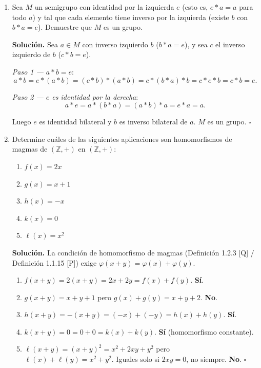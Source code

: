 \begin{enumerate}[label=\textbf{2.\arabic*.}]
\textit{Relación general} (Proposición 1.1.1): \((\mathbb{Z}_n)^*\) es grupo si y
solo si \(n\) es primo. \hfill\(\square\)

\item Sea \(M\) un semigrupo con identidad por la izquierda \(e\) (esto es,
\(e*a=a\) para todo \(a\)) y tal que cada elemento tiene inverso por la izquierda
(existe \(b\) con \(b*a=e\)). Demuestre que \(M\) es un grupo.

\textbf{Solución.}
Sea \(a \in M\) con inverso izquierdo \(b\) (\(b*a=e\)), y sea \(c\) el inverso
izquierdo de \(b\) (\(c*b=e\)).

\textit{Paso 1 --- \(a*b=e\)}:
\[
    a*b = e*(a*b) = (c*b)*(a*b) = c*(b*a)*b = c*e*b = c*b = e.
\]

\textit{Paso 2 --- \(e\) es identidad por la derecha}:
\[
    a*e = a*(b*a) = (a*b)*a = e*a = a.
\]

Luego \(e\) es identidad bilateral y \(b\) es inverso bilateral de \(a\).
\(M\) es un grupo. \hfill\(\square\)

\item Determine cuáles de las siguientes aplicaciones son homomorfismos de magmas
de \((\mathbb{Z},+)\) en \((\mathbb{Z},+)\):
\begin{enumerate}[label=\alph*)]
    \item \(f(x) = 2x\)
    \item \(g(x) = x+1\)
    \item \(h(x) = -x\)
    \item \(k(x) = 0\)
    \item \(\ell(x) = x^2\)
\end{enumerate}

\textbf{Solución.}
La condición de homomorfismo de magmas (Definición 1.2.3 [Q] / Definición 1.1.15 [P])
exige \(\varphi(x+y) = \varphi(x)+\varphi(y)\).
\begin{enumerate}[label=\alph*)]
    \item \(f(x+y)=2(x+y)=2x+2y=f(x)+f(y)\). \textbf{Sí}.
    \item \(g(x+y)=x+y+1\) pero \(g(x)+g(y)=x+y+2\). \textbf{No}.
    \item \(h(x+y)=-(x+y)=(-x)+(-y)=h(x)+h(y)\). \textbf{Sí}.
    \item \(k(x+y)=0=0+0=k(x)+k(y)\). \textbf{Sí} (homomorfismo constante).
    \item \(\ell(x+y)=(x+y)^2=x^2+2xy+y^2\) pero
    \(\ell(x)+\ell(y)=x^2+y^2\). Iguales solo si \(2xy=0\), no siempre.
    \textbf{No}. \hfill\(\square\)
\end{enumerate}


\end{enumerate}
